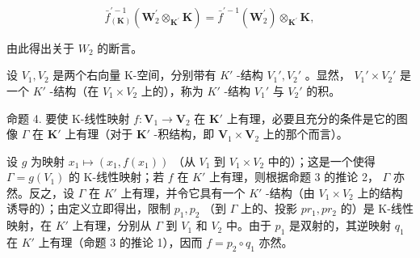 \[
\bar {f} _ {(\mathbf {K})} ^ {\prime - 1} (\mathbf {W} _ {2} ^ {\prime} \otimes_ {\mathbf {K} ^ {\prime}} \mathbf {K}) = \bar {f} ^ {\prime - 1} (\mathbf {W} _ {2} ^ {\prime}) \otimes_ {\mathbf {K} ^ {\prime}} \mathbf {K},
\]

由此得出关于 \(W_{2}\) 的断言。

设 \(V_{1}, V_{2}\) 是两个右向量 K-空间，分别带有 \(K'\) -结构 \(V_{1}', V_{2}'\) 。显然， \(V_{1}' \times V_{2}'\) 是一个 \(K'\) -结构（在 \(V_{1} \times V_{2}\) 上的），称为 \(K'\) -结构 \(V_{1}'\) 与 \(V_{2}'\) 的积。

命题 4. 要使 K-线性映射 \(f: \mathbf{V}_1 \to \mathbf{V}_2\) 在 \(\mathbf{K}'\) 上有理，必要且充分的条件是它的图像 \(\Gamma\) 在 \(\mathbf{K}'\) 上有理（对于 \(\mathbf{K}'\) -积结构，即 \(\mathbf{V}_1 \times \mathbf{V}_2\) 上的那个而言）。

设 \(g\) 为映射 \(x_1 \mapsto (x_1, f(x_1))\) （从 \(V_1\) 到 \(V_1 \times V_2\) 中的）；这是一个使得 \(\Gamma = g(V_1)\) 的 K-线性映射；若 \(f\) 在 \(K'\) 上有理，则根据命题 3 的推论 2， \(\Gamma\) 亦然。反之，设 \(\Gamma\) 在 \(K'\) 上有理，并令它具有一个 \(K'\) -结构（由 \(V_1 \times V_2\) 上的结构诱导的）；由定义立即得出，限制 \(p_1, p_2\) （到 \(\Gamma\) 上的、投影 \(pr_1, pr_2\) 的）是 K-线性映射，在 \(K'\) 上有理，分别从 \(\Gamma\) 到 \(V_1\) 和 \(V_2\) 中。由于 \(p_1\) 是双射的，其逆映射 \(q_1\) 在 \(K'\) 上有理（命题 3 的推论 1），因而 \(f = p_2 \circ q_1\) 亦然。

